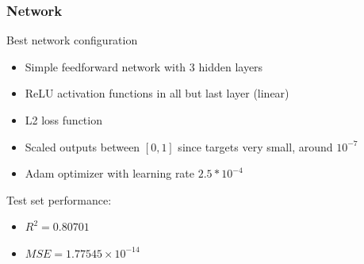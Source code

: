 \documentclass{beamer}
\begin{document}
\begin{frame}
\frametitle{Network}
Best network configuration
\begin{itemize}
\item<1-> Simple feedforward network with 3 hidden layers
\item<2-> ReLU activation functions in all but last layer (linear)
\item<3-> L2 loss function
\item<4-> Scaled outputs between $[0,1]$ since targets very small, around $10^{-7}$
\item<5-> Adam optimizer with learning rate $2.5*10^{-4}$
\end{itemize}

\pause
\pause
\pause
\pause
\pause

Test set performance:
\begin{itemize}
\item $R^2 = 0.80701$
\item $MSE = 1.77545 \times 10^{-14}$
\end{itemize}
\end{frame}
\end{document}

